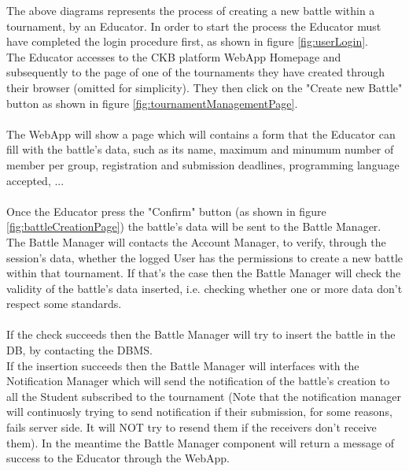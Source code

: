 \documentclass{article}
\begin{document}
{        The above diagrams represents the process of creating a new battle within a tournament,
        by an Educator. In order to start the process the Educator must have completed the login 
        procedure first, as shown in figure \ref{fig:userLogin}. \\
        The Educator accesses to the CKB platform WebApp Homepage and subsequently
        to the page of one of the tournaments they have created through their browser
        (omitted for simplicity).
        They then click on the "Create new Battle" button as shown in figure \ref{fig:tournamentManagementPage}.
        \\ \\
        The WebApp will show a page which will contains a form that the Educator can fill with
        the battle's data, such as its name, maximum and minumum number of member per group,
        registration and submission deadlines, programming language accepted, ... 
        \\ \\
        Once the Educator press the "Confirm" button (as shown in figure \ref{fig:battleCreationPage})
        the battle's data will be sent to the Battle Manager. \\
        The Battle Manager will contacts the Account Manager, to verify, through the session's 
        data, whether the logged User has the permissions to create a new battle within that 
        tournament. 
        If that's the case then the Battle Manager will check the validity of the battle's data 
        inserted, i.e. checking whether one or more data don't respect some standards.
        \\ \\
        If the check succeeds then the Battle Manager will try to insert the battle in the DB,
        by contacting the DBMS. \\
        If the insertion succeeds then the Battle Manager will interfaces with the Notification
        Manager which will send the notification of the battle's creation to all the Student
        subscribed to the tournament (Note that the notification manager will continuosly trying 
        to send notification if their submission, for some reasons, fails server side. It will 
        NOT try to resend them if the receivers don't receive them). 
        In the meantime the Battle Manager component will return a message of success to 
        the Educator through the WebApp.
        \\ \\
}
\end{document}
